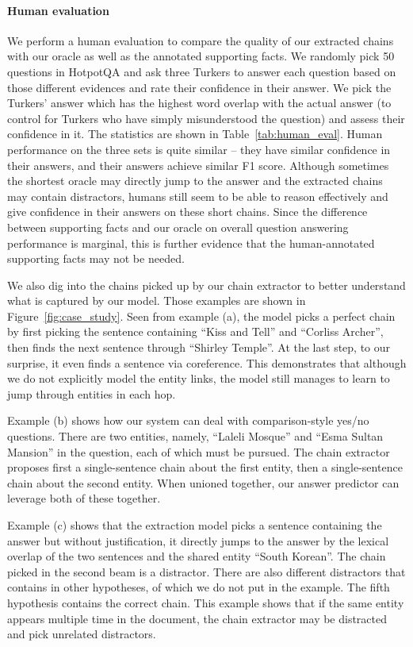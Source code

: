 \documentclass[11pt,a4paper]{article}
\begin{document}
\paragraph{Human evaluation}
We perform a human evaluation to compare the quality of our extracted chains with our oracle as well as the annotated supporting facts. We randomly pick 50 questions in HotpotQA and ask three Turkers to answer each question based on those different evidences and rate their confidence in their answer. We pick the Turkers' answer which has the highest word overlap with the actual answer (to control for Turkers who have simply misunderstood the question) and assess their confidence in it. The statistics are shown in Table~\ref{tab:human_eval}. Human performance on the three sets is quite similar -- they have similar confidence in their answers, and their answers achieve similar F1 score. Although sometimes the shortest oracle may directly jump to the answer and the extracted chains may contain distractors, humans still seem to be able to reason effectively and give confidence in their answers on these short chains. Since the difference between supporting facts and our oracle on overall question answering performance is marginal, this is further evidence that the human-annotated supporting facts may not be needed.

We also dig into the chains picked up by our chain extractor to better understand what is captured by our model. Those examples are shown in Figure~\ref{fig:case_study}. Seen from example (a), the model picks a perfect chain by first picking the sentence containing ``Kiss and Tell'' and ``Corliss Archer'', then finds the next sentence through ``Shirley Temple''. At the last step, to our surprise, it even finds a sentence via coreference. This demonstrates that although we do not explicitly model the entity links, the model still manages to learn to jump through entities in each hop.

Example (b) shows how our system can deal with comparison-style yes/no questions. There are two entities, namely, ``Laleli Mosque'' and ``Esma Sultan Mansion'' in the question, each of which must be pursued. The chain extractor proposes first a single-sentence chain about the first entity, then a single-sentence chain about the second entity. When unioned together, our answer predictor can leverage both of these together.

Example (c) shows that the extraction model picks a sentence containing the answer but without justification, it directly jumps to the answer by the lexical overlap of the two sentences and the shared entity ``South Korean''. The chain picked in the second beam is a distractor. There are also different distractors that contains in other hypotheses, of which we do not put in the example. The fifth hypothesis contains the correct chain. This example shows that if the same entity appears multiple time in the document, the chain extractor may be distracted and pick unrelated distractors.
\end{document}
